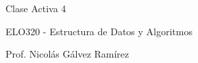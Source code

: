 \documentclass{article}
\begin{document}
\vspace{.5pc}
\centerline{\sc Clase Activa 4}
\centerline{\sc ELO320 - Estructura de Datos y Algoritmos}
\centerline{\sc Prof. Nicolás Gálvez Ramírez}
\vspace{2pc}
\end{document}
